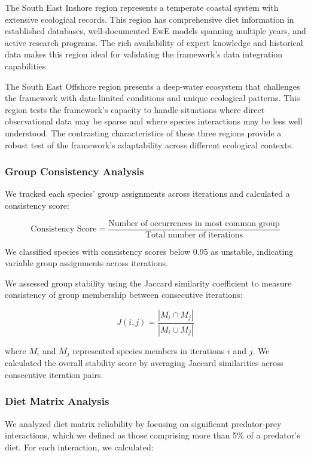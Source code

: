 The South East Inshore region represents a temperate coastal system with extensive ecological records. This region has comprehensive diet information in established databases, well-documented EwE models spanning multiple years, and active research programs. The rich availability of expert knowledge and historical data makes this region ideal for validating the framework's data integration capabilities.

The South East Offshore region presents a deep-water ecosystem that challenges the framework with data-limited conditions and unique ecological patterns. This region tests the framework's capacity to handle situations where direct observational data may be sparse and where species interactions may be less well understood. The contrasting characteristics of these three regions provide a robust test of the framework's adaptability across different ecological contexts.


\subsubsection{Group  Consistency Analysis}

We tracked each species' group assignments across iterations and calculated a consistency score:

\[
\text{Consistency Score} = \frac{\text{Number of occurrences in most common group}}{\text{Total number of iterations}}
\]

We classified species with consistency scores below 0.95 as unstable, indicating variable group assignments across iterations.

We assessed group stability using the Jaccard similarity coefficient to measure consistency of group membership between consecutive iterations:

\[
J(i,j) = \frac{|M_{i} \cap M_{j}|}{|M_{i} \cup M_{j}|}
\]

where $M_{i}$ and $M_{j}$ represented species members in iterations $i$ and $j$. We calculated the overall stability score by averaging Jaccard similarities across consecutive iteration pairs.

\subsubsection{Diet Matrix Analysis}
We analyzed diet matrix reliability by focusing on significant predator-prey interactions, which we defined as those comprising more than 5\% of a predator's diet. For each interaction, we calculated:

